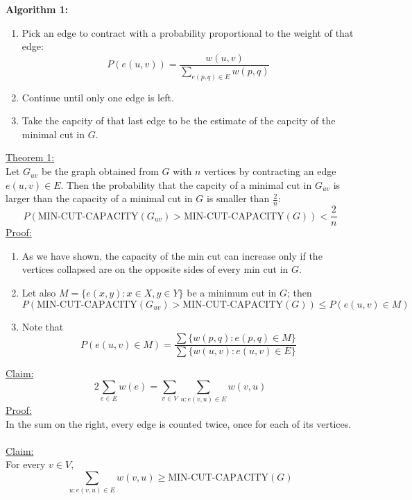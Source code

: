 \documentclass[12pt, letterpaper]{article}
\begin{document}
\textbf{Algorithm 1:}\\
\begin{enumerate}
    \item Pick an edge to contract with a probability proportional to the weight of that edge:\[P(e(u, v)) = \frac{w(u, v)}{\sum_{e(p, q)\in E}w(p, q)}\]
    \item Continue until only one edge is left.
    \item Take the capcity of that last edge to be the estimate of the capcity of the minimal cut in $G$.
\end{enumerate}
\underline{Theorem 1:}\\
Let $G_{uv}$ be the graph obtained from $G$ with $n$ vertices by contracting an edge $e(u, v)\in E$. Then the probability that the capcity of a minimal cut in $G_{uv}$ is larger than the capacity of a minimal cut in $G$ is smaller than $\frac{2}{n}$:\begin{equation}
    P(\text{MIN-CUT-CAPACITY}(G_{uv}) > \text{MIN-CUT-CAPACITY}(G)) < \frac{2}{n}
\end{equation}
\underline{Proof:}\\
\begin{enumerate}
    \item As we have shown, the capacity of the min cut can increase only if the vertices collapsed are on the opposite sides of every min cut in $G$.
    \item Let also $M = \{e(x,y) : x\in X, y\in Y\}$ be a minimum cut in $G$; then \begin{equation}
        P(\text{MIN-CUT-CAPACITY}(G_{uv}) > \text{MIN-CUT-CAPACITY}(G))\leq P(e(u, v)\in M)
    \end{equation}
    \item Note that \begin{equation}
        P(e(u, v)\in M) = \frac{\sum \{w(p, q) : e(p, q)\in M\}}{\sum \{w(u, v) : e(u, v)\in E\}}
    \end{equation}
\end{enumerate}
\underline{Claim:} \begin{equation}
    2\sum_{e\in E}w(e) = \sum_{v\in V}\sum_{u : e(v, u)\in E}w(v, u)
\end{equation}
\underline{Proof:}\\
In the sum on the right, every edge is counted twice, once for each of its vertices.\\\\
\underline{Claim:}\\
For every $v\in V,$\begin{equation}
    \sum_{u: e(v, u)\in E}w(v, u)\geq \text{MIN-CUT-CAPACITY}(G)
\end{equation}
\end{document}
